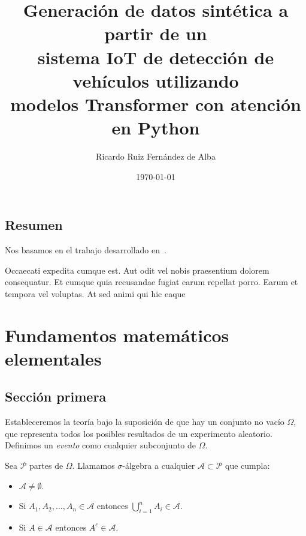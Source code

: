 \documentclass[oneside,openright,titlepage,numbers=noenddot,openany,headinclude,footinclude=true,
cleardoublepage=empty,abstractoff,BCOR=5mm,paper=a4,fontsize=12pt,main=spanish]{scrreprt}
\author{Ricardo Ruiz Fernández de Alba}
\date{\today}
\title{Generación de datos sintética a partir de un \\  sistema IoT de detección
de vehículos utilizando \\ modelos Transformer con atención en Python}
\begin{document}
\maketitle
\tableofcontents


\chapter*{Resumen}


Nos basamos en el trabajo desarrollado en~\cite{vaswani_attention_2017}.

Occaecati expedita cumque est. Aut odit vel nobis praesentium dolorem
consequatur. Et cumque quia recusandae fugiat earum repellat
porro. Earum et tempora vel voluptas. At sed animi qui hic eaque



\part{Fundamentos matemáticos elementales}

\chapter{Sección primera}

Estableceremos la teoría bajo la suposición de que hay un conjunto no vacío
$\Omega$, que representa todos los posibles resultados de un experimento aleatorio.
Definimos un \textit{evento} como cualquier subconjunto de $\Omega$.

\begin{definition}
Sea $\mathcal{P}$ partes de $\Omega$. Llamamos $\sigma$-álgebra a cualquier $\mathcal{A} \subset \mathcal{P}$ que cumpla:

\begin{itemize}
\item $ \mathcal{A} \neq \emptyset$.
\item Si $A_1, A_2, \ldots, A_n \in \mathcal{A}$ entonces $\bigcup_{i=1}^n A_i \in \mathcal{A}$.
\item Si $A \in \mathcal{A}$ entonces $A^c \in \mathcal{A}$.
\end{itemize}
\end{definition}
\end{document}
